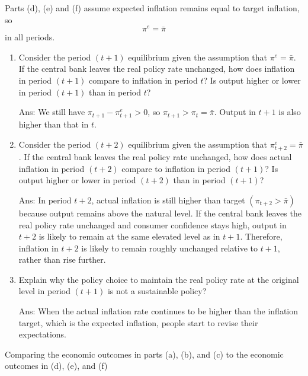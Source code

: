 \documentclass[12pt]{article}
\begin{document}
Parts (d), (e) and (f) assume expected inflation remains equal to target inflation, so
\[
\pi^e=\bar{\pi}
\]
in all periods.

\begin{enumerate}[label=(\alph*),start=4]
    \item Consider the period \((t+1)\) equilibrium given the assumption that \(\pi^e=\bar{\pi}\). If the central bank leaves the real policy rate unchanged, how does inflation in period \((t+1)\) compare to inflation in period \(t\)? Is output higher or lower in period \((t+1)\) than in period \(t\)?

    Ans: We still have \(\pi_{t+1}-\pi^e_{t+1}>0\), so \(\pi_{t+1}>\pi_t=\bar{\pi}\). Output in \(t+1\) is also higher than that in \(t\).

    \item Consider the period \((t+2)\) equilibrium given the assumption that \(\pi^e_{t+2}=\bar{\pi}\). If the central bank leaves the real policy rate unchanged, how does actual inflation in period \((t+2)\) compare to inflation in period \((t+1)\)? Is output higher or lower in period \((t+2)\) than in period \((t+1)\)?

    Ans: In period \(t+2\), actual inflation is still higher than target \((\pi_{t+2}>\bar{\pi})\) because output remains above the natural level. If the central bank leaves the real policy rate unchanged and consumer confidence stays high, output in \(t+2\) is likely to remain at the same elevated level as in \(t+1\). Therefore, inflation in \(t+2\) is likely to remain roughly unchanged relative to \(t+1\), rather than rise further.

    \item Explain why the policy choice to maintain the real policy rate at the original level in period \((t+1)\) is not a sustainable policy?

    Ans: When the actual inflation rate continues to be higher than the inflation target, which is the expected inflation, people start to revise their expectations.
\end{enumerate}

Comparing the economic outcomes in parts (a), (b), and (c) to the economic outcomes in (d), (e), and (f)
\end{document}
